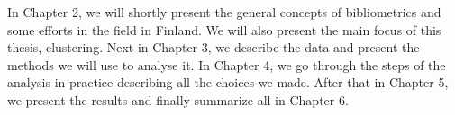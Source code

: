 

In Chapter 2, we will shortly present the general concepts of 
bibliometrics and some efforts in the field in Finland. We will 
also present the main focus of this thesis, clustering.
Next in Chapter 3, we describe the data and present the methods we 
will use to analyse it.
In Chapter 4, we go through the steps of the analysis in practice 
describing all the choices we made.
After that in Chapter 5, we present the results and finally 
summarize all in Chapter 6.











